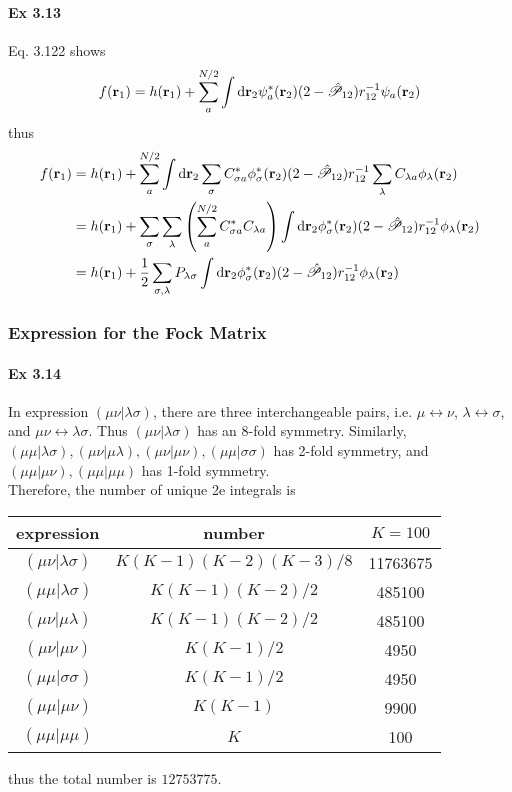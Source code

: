 \documentclass[a4paper]{article}
\newcommand{\hsP}{\hat{\mathscr{P}}}
\newcommand{\ex}[1]{\paragraph{Ex #1}}
\numberwithin{equation}{subsection}
\begin{document}
\ex{3.13}
Eq. 3.122 shows
\begin{equation}\label{key}
f(\vb{r}_1) = h(\vb{r}_1) + \sum_a^{N/2}\int \dd\vb{r}_2 \psi_a^*(\vb{r}_2) (2-\hsP_{12}) r_{12}^{-1} \psi_a(\vb{r}_2)
\end{equation}
thus
\begin{align}
f(\vb{r}_1) &= h(\vb{r}_1) 
+ \sum_a^{N/2}\int \dd\vb{r}_2 
\sum_\sigma C_{\sigma a}^* \phi_\sigma^*(\vb{r}_2) (2-\hsP_{12}) r_{12}^{-1} \sum_\lambda C_{\lambda a} \phi_\lambda(\vb{r}_2) \notag\\
&= h(\vb{r}_1) 
+ \sum_\sigma\sum_\lambda \qty(\sum_a^{N/2} C_{\sigma a}^*C_{\lambda a} )
\int \dd\vb{r}_2 \phi_\sigma^*(\vb{r}_2) (2-\hsP_{12}) r_{12}^{-1}  \phi_\lambda(\vb{r}_2) \notag\\
&= h(\vb{r}_1) 
+ \dfrac{1}{2} \sum_{\sigma,\lambda} P_{\lambda\sigma}
\int \dd\vb{r}_2 \phi_\sigma^*(\vb{r}_2) (2-\hsP_{12}) r_{12}^{-1}  \phi_\lambda(\vb{r}_2) 
\end{align}

\subsubsection{Expression for the Fock Matrix}
\ex{3.14}
In expression $ (\mu\nu|\lambda\sigma) $, there are three interchangeable pairs, i.e. $\mu\leftrightarrow\nu $, $ \lambda\leftrightarrow\sigma $, and $ \mu\nu\leftrightarrow\lambda\sigma $. Thus $ (\mu\nu|\lambda\sigma) $ has an 8-fold symmetry. Similarly, %
$ (\mu\mu|\lambda\sigma), (\mu\nu|\mu\lambda), (\mu\nu|\mu\nu), (\mu\mu|\sigma\sigma) $ has 2-fold symmetry, and $ (\mu\mu|\mu\nu), (\mu\mu|\mu\mu) $ has 1-fold symmetry.\\
Therefore, the number of unique 2e integrals is
\begin{table}[H]
	\centering
	\begin{tabular}{ccc}
		\hline
		expression & number & $ K=100 $\\ \hline
		 $ (\mu\nu|\lambda\sigma) $ & $ K(K-1)(K-2)(K-3)/8 $ & 11763675 \\
		 $ (\mu\mu|\lambda\sigma)$ & $ K(K-1)(K-2)/2 $& 485100\\
		 $ (\mu\nu|\mu\lambda)$ & $ K(K-1)(K-2)/2 $& 485100\\
		 $ (\mu\nu|\mu\nu) $ & $ K(K-1)/2 $ & 4950\\
		 $ (\mu\mu|\sigma\sigma) $ & $ K(K-1)/2 $ & 4950\\
		 $ (\mu\mu|\mu\nu) $ & $ K(K-1) $ & 9900\\
		 $ (\mu\mu|\mu\mu) $ & $ K $ & 100\\
		 \hline
	\end{tabular}
\end{table}
thus the total number is $ \num{12753775} $.
\end{document}
